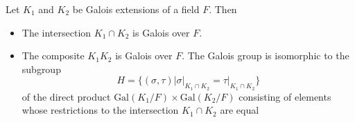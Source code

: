 \documentclass[12pt, a4paper, oneside, openright, titlepage]{book}
\begin{document}
\begin{prop}\label{prop:Galprod}
    Let $K_1$ and $K_2$ be Galois extensions of a field $F$. Then \begin{itemize}
        \item The intersection $K_1\cap K_2$ is Galois over $F$.
        \item The composite $K_1K_2$ is Galois over $F$. The Galois group is isomorphic to the subgroup \begin{equation*}
                H = \{(\sigma,\tau)\vert\sigma\vert_{K_1\cap K_2} = \tau\vert_{K_1\cap K_2}\}
        \end{equation*}
            of the direct product $\text{Gal}(K_1/F)\times \text{Gal}(K_2/F)$ consisting of elements whose restrictions to the intersection $K_1\cap K_2$ are equal
    \end{itemize}
    \begin{center}
    \end{center}
\end{prop}
\end{document}
